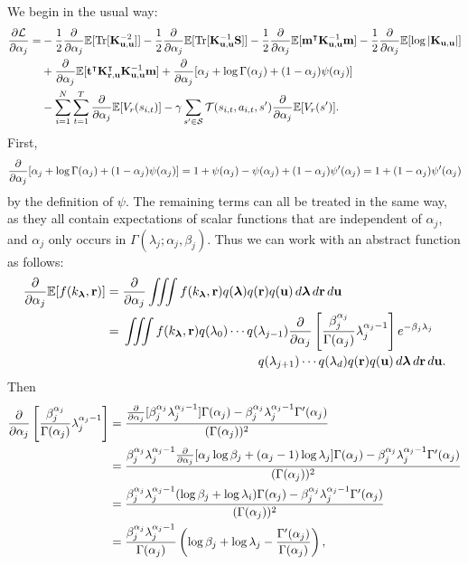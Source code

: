 \documentclass{mprop}
\theoremstyle{definition}
\DeclareMathOperator{\Tr}{Tr}
\begin{document}
We begin in the usual way:
\[
  \begin{split}
    \frac{\partial\mathcal{L}}{\partial\alpha_j} = &-
    \frac{1}{2}\da\mathbb{E}[\Tr[\Kuu^{-2}]] - \frac{1}{2}\da\mathbb{E}[\Tr[\Kuu^{-1}\mathbf{S}]] - \frac{1}{2}\da\mathbb{E}[\mathbf{m}^\intercal\Kuu^{-1}\mathbf{m}] - \frac{1}{2}\da\mathbb{E}[\log|\Kuu|] \\
    &+ \da\mathbb{E}[\mathbf{t}^\intercal\Kru^\intercal\Kuu^{-1}\mathbf{m}] +
    \da [\alpha_j + \log\Gamma(\alpha_j) + (1 - \alpha_j)\psi(\alpha_j)] \\
      &- \sum_{i=1}^N \sum_{t=1}^T \da\mathbb{E}[V_r(s_{i,t})] -
        \gamma\sum_{s' \in \mathcal{S}} \mathcal{T}(s_{i,t}, a_{i,t},
        s')\da\mathbb{E}[V_r(s')].
  \end{split}
\]
First,
\[ \frac{\partial}{\partial\alpha_j} [\alpha_j + \log\Gamma(\alpha_j) + (1 - \alpha_j)\psi(\alpha_j)] = 1 +
  \psi(\alpha_j) - \psi(\alpha_j) + (1 - \alpha_j)\psi'(\alpha_j) = 1 + (1 -
  \alpha_j)\psi'(\alpha_j) \]
by the definition of $\psi$. The remaining terms can all be treated in the same
way, as they all contain expectations of scalar functions that are independent
of $\alpha_j$, and $\alpha_j$ only occurs in $\Gamma(\lambda_j; \alpha_j,
\beta_j)$. Thus we can work with an abstract function as follows:
\[
  \begin{split}
    \da\mathbb{E}[f(k_{\bm\lambda}, \mathbf{r})] &= \da \iiint f(k_{\bm\lambda},
    \mathbf{r}) q(\bm\lambda) q(\mathbf{r})
    q(\mathbf{u})\,d\bm\lambda\,d\mathbf{r}\,d\mathbf{u} \\
    &= \!\begin{multlined}[t]
      \iiint f(k_{\bm\lambda}, \mathbf{r}) q(\lambda_0) \cdots q(\lambda_{j-1}) \da
      \left[ \frac{\beta_j^{\alpha_j}}{\Gamma(\alpha_j)} \lambda_j^{\alpha_j -
          1} \right] e^{-\beta_j\lambda_j} \\
      q(\lambda_{j+1}) \cdots q(\lambda_d) q(\mathbf{r})
      q(\mathbf{u})\,d\bm\lambda\,d\mathbf{r}\,d\mathbf{u}.
    \end{multlined}
  \end{split}
\]
Then
\[
  \begin{split}
    \frac{\partial}{\partial\alpha_j} \left[ \frac{\beta_j^{\alpha_j}}{\Gamma(\alpha_j)} \lambda_j^{\alpha_j - 1} \right] &=
    \frac{\frac{\partial}{\partial\alpha_j}[\beta_j^{\alpha_j}\lambda_j^{\alpha_j - 1}]\Gamma(\alpha_j) -
      \beta_j^{\alpha_j}\lambda_j^{\alpha_j - 1}\Gamma'(\alpha_j)}{(\Gamma(\alpha_j))^2} \\
    &= \frac{\beta_j^{\alpha_j}\lambda_j^{\alpha_j - 1}\frac{\partial}{\partial\alpha_j}[\alpha_j\log\beta_j + (\alpha_j -
      1)\log\lambda_j]\Gamma(\alpha_j) - \beta_j^{\alpha_j}\lambda_j^{\alpha_j -
        1}\Gamma'(\alpha_j)}{(\Gamma(\alpha_j))^2} \\
    &= \frac{\beta_j^{\alpha_j}\lambda_j^{\alpha_j - 1}(\log\beta_j + \log\lambda_i)\Gamma(\alpha_j)
      - \beta_j^{\alpha_j}\lambda_j^{\alpha_j - 1}\Gamma'(\alpha_j)}{(\Gamma(\alpha_j))^2} \\
    &= \frac{\beta_j^{\alpha_j}\lambda_j^{\alpha_j - 1}}{\Gamma(\alpha_j)}\left(\log\beta_j +
    \log\lambda_j - \frac{\Gamma'(\alpha_j)}{\Gamma(\alpha_j)}\right),
  \end{split}
\]
\end{document}
